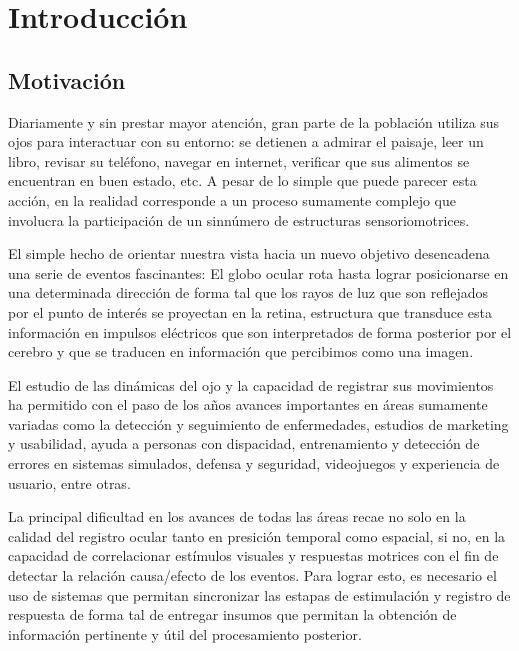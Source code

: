 \documentclass[../main.tex]{subfiles}
\begin{document}
		
\chapter{Introducción}
\label{cha:01_introducción}
	\section{Motivación}
	\label{sec:01_motivacion}
		Diariamente y sin prestar mayor atención, gran parte de la población utiliza sus ojos para interactuar con su entorno: se detienen a admirar el paisaje, leer un libro, revisar su teléfono, navegar en internet, verificar que sus alimentos se encuentran en buen estado, etc. A pesar de lo simple que puede parecer esta acción, en la realidad corresponde a un proceso sumamente complejo que involucra la participación de un sinnúmero de estructuras sensoriomotrices. 

		El simple hecho de orientar nuestra vista hacia un nuevo objetivo desencadena una serie de eventos fascinantes: El globo ocular rota hasta lograr posicionarse en una determinada dirección de forma tal que los rayos de luz que son reflejados por el punto de interés se proyectan en la \gls{retina}, estructura que transduce esta información en impulsos eléctricos que son interpretados de forma posterior por el cerebro y que se traducen en información que percibimos como una imagen.  

		El estudio de las dinámicas del ojo y la capacidad de registrar sus movimientos ha permitido con el paso de los años avances importantes en áreas sumamente variadas como la detección y seguimiento de enfermedades, estudios de marketing y usabilidad, ayuda a personas con dispacidad, entrenamiento y detección de errores en sistemas simulados, defensa y seguridad, videojuegos y experiencia de usuario, entre otras.

		La principal dificultad en los avances de todas las áreas recae no solo en la calidad del registro ocular tanto en presición temporal como espacial, si no, en la capacidad de correlacionar estímulos visuales y respuestas motrices con el fin de detectar la relación causa/efecto de los eventos. Para lograr esto, es necesario el uso de sistemas que permitan sincronizar las estapas de estimulación y registro de respuesta de forma tal de entregar insumos que permitan la obtención de información pertinente y útil del procesamiento posterior.  
\end{document}
